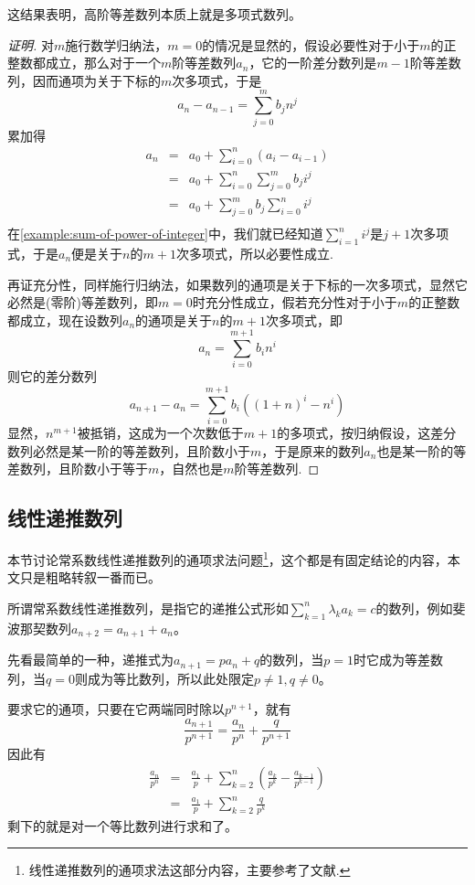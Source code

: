 这结果表明，高阶等差数列本质上就是多项式数列。

\begin{proof}[证明]
  对$m$施行数学归纳法，$m=0$的情况是显然的，假设必要性对于小于$m$的正整数都成立，那么对于一个$m$阶等差数列$a_n$，它的一阶差分数列是$m-1$阶等差数列，因而通项为关于下标的$m$次多项式，于是
  \[ a_n-a_{n-1} = \sum_{j=0}^m b_jn^j \]
  累加得
  \begin{eqnarray*}
    a_n & = & a_0 + \sum_{i=0}^n(a_i-a_{i-1}) \\
        & = & a_0 + \sum_{i=0}^n\sum_{j=0}^mb_ji^j \\
    & = & a_0 + \sum_{j=0}^mb_j\sum_{i=0}^ni^j \\
  \end{eqnarray*}
  在\autoref{example:sum-of-power-of-integer}中，我们就已经知道$\sum_{i=1}^ni^j$是$j+1$次多项式，于是$a_n$便是关于$n$的$m+1$次多项式，所以必要性成立.

  再证充分性，同样施行归纳法，如果数列的通项是关于下标的一次多项式，显然它必然是(零阶)等差数列，即$m=0$时充分性成立，假若充分性对于小于$m$的正整数都成立，现在设数列$a_n$的通项是关于$n$的$m+1$次多项式，即
  \[ a_n = \sum_{i=0}^{m+1}b_in^i \]
  则它的差分数列
  \[ a_{n+1}-a_n = \sum_{i=0}^{m+1}b_i((1+n)^i-n^i) \]
  显然，$n^{m+1}$被抵销，这成为一个次数低于$m+1$的多项式，按归纳假设，这差分数列必然是某一阶的等差数列，且阶数小于$m$，于是原来的数列$a_n$也是某一阶的等差数列，且阶数小于等于$m$，自然也是$m$阶等差数列.
\end{proof}

\subsection{线性递推数列}
\label{subsec:linear-recurrence-sequence}

本节讨论常系数线性递推数列的通项求法问题\footnote{线性递推数列的通项求法这部分内容，主要参考了文献\cite{olympic-math}.}，这个都是有固定结论的内容，本文只是粗略转叙一番而已。

所谓常系数线性递推数列，是指它的递推公式形如$\sum_{k=1}^n \lambda _k a_k = c$的数列，例如斐波那契数列$a_{n+2}=a_{n+1}+a_n$。

先看最简单的一种，递推式为$a_{n+1}=pa_n+q$的数列，当$p=1$时它成为等差数列，当$q=0$则成为等比数列，所以此处限定$p \neq 1, q \neq 0$。

要求它的通项，只要在它两端同时除以$p^{n+1}$，就有
\[ \frac{a_{n+1}}{p^{n+1}} = \frac{a_n}{p^n} + \frac{q}{p^{n+1}} \]
因此有
\begin{eqnarray*}
\frac{a_n}{p^n} & = & \frac{a_1}{p} + \sum_{k=2}^{n}\left( \frac{a_k}{p^k} - \frac{a_{k-1}}{p^{k-1}} \right) \\
& = & \frac{a_1}{p} + \sum_{k=2}^{n}\frac{q}{p^k}
\end{eqnarray*}
剩下的就是对一个等比数列进行求和了。

